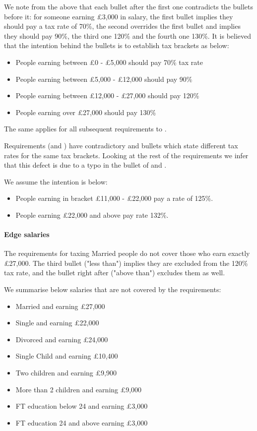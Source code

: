 We note from the above that each bullet after the first one contradicts the bullets before it: for someone earning £3,000 in salary, the first bullet implies they should pay a tax rate of 70\%, the second overrides the first bullet and implies they should pay 90\%, the third one 120\% and the fourth one 130\%. It is believed that the intention behind the bullets is to establish tax brackets as below: 
\begin{itemize}
	\item People earning between £0 - £5,000 should pay 70\% tax rate 
	\item People earning between £5,000 - £12,000 should pay 90\%
	\item People earning between £12,000 - £27,000 should pay 120\%
	\item People earning over £27,000 should pay 130\%
\end{itemize}
The same applies for all subsequent requirements \REightSix \space to \REightTwelve. 

Requirements (\REightSix \space and \REightSeven) have contradictory  and  bullets which state different tax rates for the same tax brackets. Looking at the rest of the requirements we infer that this defect is due to a typo in the  bullet of \REightSix \space and \REightSeven. 

We assume the intention is below: 
\begin{itemize}
	\item People earning in bracket £11,000 - £22,000 pay a rate of 125\%.
	\item People earning £22,000 and above pay rate 132\%.
\end{itemize}

\paragraph{Edge salaries}
The requirements for taxing Married people do not cover those who earn exactly £27,000. The third bullet ("less than") implies they are excluded from the 120\% tax rate, and the bullet right after ("above than") excludes them as well. 
\par
We summarise below salaries that are not covered by the requirements:  
\begin{itemize}
	\item Married and earning £27,000
	\item Single and earning £22,000
	\item Divorced and earning £24,000
	\item Single Child and earning £10,400
	\item Two children and earning £9,900
	\item More than 2 children and earning £9,000
	\item FT education below 24 and earning £3,000
	\item FT education 24 and above earning £3,000
\end{itemize}

